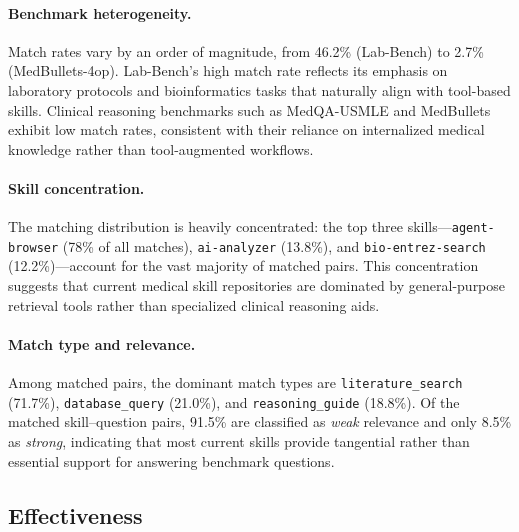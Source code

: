 \paragraph{Benchmark heterogeneity.}
Match rates vary by an order of magnitude, from 46.2\% (Lab-Bench) to 2.7\% (MedBullets-4op).
Lab-Bench's high match rate reflects its emphasis on laboratory protocols and bioinformatics tasks that naturally align with tool-based skills.
Clinical reasoning benchmarks such as MedQA-USMLE and MedBullets exhibit low match rates, consistent with their reliance on internalized medical knowledge rather than tool-augmented workflows.

\paragraph{Skill concentration.}
The matching distribution is heavily concentrated: the top three skills---\texttt{agent-browser} (78\% of all matches), \texttt{ai-analyzer} (13.8\%), and \texttt{bio-entrez-search} (12.2\%)---account for the vast majority of matched pairs.
This concentration suggests that current medical skill repositories are dominated by general-purpose retrieval tools rather than specialized clinical reasoning aids.

\paragraph{Match type and relevance.}
Among matched pairs, the dominant match types are \texttt{literature\_search} (71.7\%), \texttt{database\_query} (21.0\%), and \texttt{reasoning\_guide} (18.8\%).
Of the matched skill--question pairs, 91.5\% are classified as \emph{weak} relevance and only 8.5\% as \emph{strong}, indicating that most current skills provide tangential rather than essential support for answering benchmark questions.

\subsection{\gepamed Effectiveness}
\label{ssec:gepa_results}

\begin{table}[t]
\centering\small
\caption{\gepamed effectiveness: Core Pass Rate and \rbu gap before and after skill description evolution.}
\label{tab:gepa_results}
\end{table}

